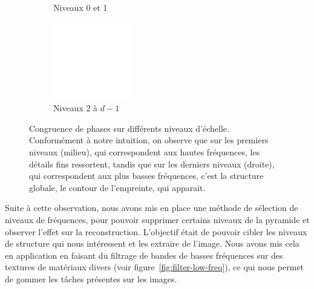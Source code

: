 \begin{figure}
\begin{subfigure}[b]{.25\textwidth}
        \caption{Niveaux 0 et 1}
    \end{subfigure}
    \hfill
    \begin{subfigure}[b]{.25\textwidth}
        \centering
        \includegraphics[width=\textwidth]{contenu/resources/images/pc_layer_2_depth-1}
        \caption{Niveaux 2 à $d-1$}
    \end{subfigure}

    \caption[Congruence de phases sur différents niveaux d'échelle]{Congruence de phases sur différents niveaux d'échelle. Conformément à notre intuition, on observe que sur les premiers niveaux (milieu), qui correspondent aux hautes fréquences, les détails fins ressortent, tandis que sur les derniers niveaux (droite), qui correspondent aux plus basses fréquences, c'est la structure globale, le contour de l'empreinte, qui apparait.}
    \label{fig:pc-selection-niveaux}
\end{figure}

Suite à cette observation, nous avons mis en place une méthode de sélection de niveaux de fréquences, pour pouvoir supprimer certains niveaux de la pyramide et observer l'effet sur la reconstruction. L'objectif était de pouvoir cibler les niveaux de structure qui nous intéressent et les extraire de l'image. Nous avons mis cela en application en faisant du filtrage de bandes de basses fréquences sur des textures de matériaux divers (voir figure~\ref{fig:filter-low-freq}), ce qui nous permet de \og gommer \fg{} les tâches présentes sur les images.

